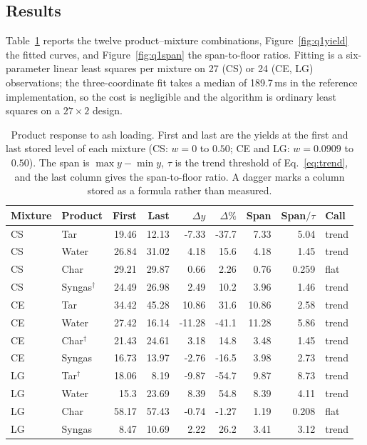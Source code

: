 \documentclass[withoutpreface,bwprint]{apmcmthesis}
\begin{document}
\subsection{Results}
Table~\ref{tab:q1} reports the twelve product--mixture combinations, Figure~\ref{fig:q1yield} the fitted curves, and Figure~\ref{fig:q1span} the span-to-floor ratios. Fitting is a six-parameter linear least squares per mixture on 27 (CS) or 24 (CE, LG) observations; the three-coordinate fit takes a median of 189.7\,ms in the reference implementation, so the cost is negligible and the algorithm is ordinary least squares on a $27\times2$ design.

\begin{table}[htbp]\centering
\caption{Product response to ash loading. First and last are the yields at the first and last stored level of each mixture (CS: $w=0$ to $0.50$; CE and LG: $w=0.0909$ to $0.50$). The span is $\max y-\min y$, $\tau$ is the trend threshold of Eq.~\eqref{eq:trend}, and the last column gives the span-to-floor ratio. A dagger marks a column stored as a formula rather than measured.}
\label{tab:q1}
{\small\setlength{\tabcolsep}{1.7pt}
\begin{tabular}{@{}llrrrrrrl@{}}
\toprule
Mixture & Product & First & Last & $\Delta y$ & $\Delta\%$ & Span & Span$/\tau$ & Call\\
\midrule
CS & Tar & 19.46 & 12.13 & -7.33 & -37.7 & 7.33 & 5.04 & trend\\
CS & Water & 26.84 & 31.02 & 4.18 & 15.6 & 4.18 & 1.45 & trend\\
CS & Char & 29.21 & 29.87 & 0.66 & 2.26 & 0.76 & 0.259 & flat\\
CS & Syngas$^{\dagger}$ & 24.49 & 26.98 & 2.49 & 10.2 & 3.96 & 1.46 & trend\\
CE & Tar & 34.42 & 45.28 & 10.86 & 31.6 & 10.86 & 2.58 & trend\\
CE & Water & 27.42 & 16.14 & -11.28 & -41.1 & 11.28 & 5.86 & trend\\
CE & Char$^{\dagger}$ & 21.43 & 24.61 & 3.18 & 14.8 & 3.48 & 1.45 & trend\\
CE & Syngas & 16.73 & 13.97 & -2.76 & -16.5 & 3.98 & 2.73 & trend\\
LG & Tar$^{\dagger}$ & 18.06 & 8.19 & -9.87 & -54.7 & 9.87 & 8.73 & trend\\
LG & Water & 15.3 & 23.69 & 8.39 & 54.8 & 8.39 & 4.11 & trend\\
LG & Char & 58.17 & 57.43 & -0.74 & -1.27 & 1.19 & 0.208 & flat\\
LG & Syngas & 8.47 & 10.69 & 2.22 & 26.2 & 3.41 & 3.12 & trend\\
\bottomrule
\end{tabular}}
\end{table}
\end{document}
